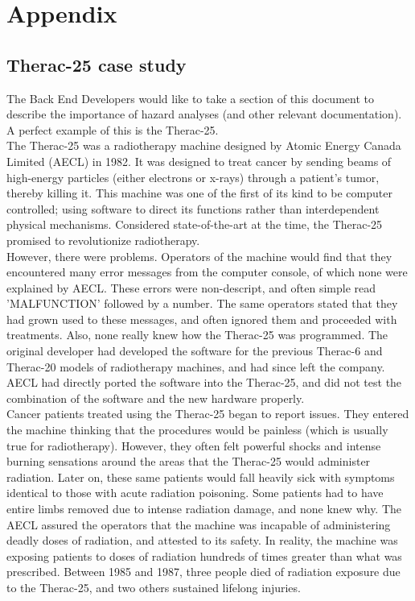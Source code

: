 \documentclass{article}
\begin{document}
\section*{Appendix}
\subsection*{Therac-25 case study}
The Back End Developers would like to take a section of this document to describe the importance of hazard analyses (and other relevant documentation). A perfect example of this is the Therac-25.\\

The Therac-25 was a radiotherapy machine designed by Atomic Energy Canada Limited (AECL) in 1982. It was designed to treat cancer by sending beams of high-energy particles (either electrons or x-rays) through a patient's tumor, thereby killing it. This machine was one of the first of its kind to be computer controlled; using software to direct its functions rather than interdependent physical mechanisms. \cite{leveson-1999} Considered state-of-the-art at the time, the Therac-25 promised to revolutionize radiotherapy.\\

However, there were problems. Operators of the machine would find that they encountered many error messages from the computer console, of which none were explained by AECL. These errors were non-descript, and often simple read 'MALFUNCTION' followed by a number. The same operators stated that they had grown used to these messages, and often ignored them and proceeded with treatments. Also, none really knew how the Therac-25 was programmed. The original developer had developed the software for the previous Therac-6 and Therac-20 models of radiotherapy machines, and had since left the company. AECL had directly ported the software into the Therac-25, and did not test the combination of the software and the new hardware properly.\\

Cancer patients treated using the Therac-25 began to report issues. They entered the machine thinking that the procedures would be painless (which is usually true for radiotherapy). However, they often felt powerful shocks and intense burning sensations around the areas that the Therac-25 would administer radiation. Later on, these same patients would fall heavily sick with symptoms identical to those with acute radiation poisoning. Some patients had to have entire limbs removed due to intense radiation damage, and none knew why. The AECL assured the operators that the machine was incapable of administering deadly doses of radiation, and attested to its safety.\cite{leveson-turner-1993} In reality, the machine was exposing patients to doses of radiation hundreds of times greater than what was prescribed.\cite{baase-henry-2019} Between 1985 and 1987, three people died of radiation exposure due to the Therac-25, and two others sustained lifelong injuries.\\
\end{document}
